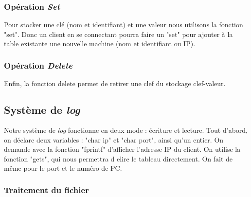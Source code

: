 \documentclass[12pt,a4paper]{article}
\begin{document}
\subsubsection{Opération \textit{Set}}

\quad Pour stocker une clé (nom et identifiant) et une valeur nous utilisons la fonction "set". Donc un client en se connectant pourra faire un "set" pour ajouter à la table existante une nouvelle machine (nom et identifiant ou IP).

\subsubsection{Opération \textit{Delete}}

Enfin, la fonction delete permet de retirer une clef du stockage clef-valeur.



\subsection{Système de \textit{log}}

\quad Notre système de \textit{log} fonctionne en deux mode : écriture et lecture. Tout d'abord, on déclare deux variables : "char ip" et "char port", ainsi qu'un entier. On demande avec la fonction "fprintf" d'afficher l'adresse IP du client. On utilise la fonction "gets", qui nous permettra d elire le tableau directement. On fait de même pour le port et le numéro de PC.

\subsubsection{Traitement du fichier}
\end{document}
